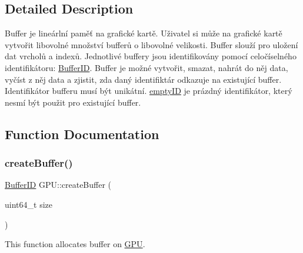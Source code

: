 \subsection{Detailed Description}
Buffer je lineárlní paměť na grafické kartě. Uživatel si může na grafické kartě vytvořit libovolné množství bufferů o libovolné velikosti. Buffer slouží pro uložení dat vrcholů a indexů. Jednotlivé buffery jsou identifikovány pomocí celočíselného identifikátoru\+: \hyperlink{fwd_8hpp_a5114031b77b80ad895eff688720b7f93}{Buffer\+ID}. Buffer je možné vytvořit, smazat, nahrát do něj data, vyčíst z něj data a zjistit, zda daný identifiktár odkazuje na existující buffer. Identifikátor bufferu musí být unikátní. \hyperlink{fwd_8hpp_a85f029d54035997f9d5f499008d5f623}{empty\+ID} je prázdný identifikátor, který nesmí být použit pro existující buffer. 

\subsection{Function Documentation}
\mbox{\label{group__buffer__tasks_ga309724692e0d90a686642379f12d8d44}} 
\subsubsection{\texorpdfstring{create\+Buffer()}{createBuffer()}}
{\footnotesize\ttfamily \hyperlink{fwd_8hpp_a5114031b77b80ad895eff688720b7f93}{Buffer\+ID} G\+P\+U\+::create\+Buffer (\begin{DoxyParamCaption}\item[{uint64\+\_\+t}]{size }\end{DoxyParamCaption})}



This function allocates buffer on \hyperlink{classGPU}{G\+PU}. 


